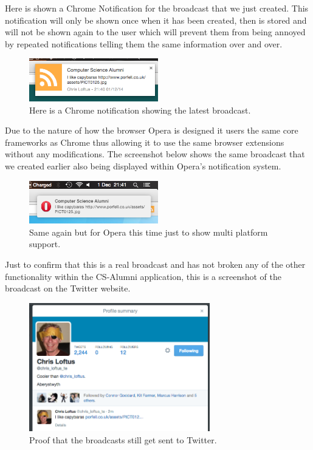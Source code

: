 \documentclass{article}
\begin{document}
Here is shown a Chrome Notification for the broadcast that we just created. This notification will only be shown once when it has been created, then is stored and will not be shown again to the user which will prevent them from being annoyed by repeated notifications telling them the same information over and over.

\begin{figure}[H]
\centering
\includegraphics[width=0.5\textwidth]{chromenotification}
\caption{Here is a Chrome notification showing the latest broadcast.}
\end{figure}

Due to the nature of how the browser Opera is designed it users the same core frameworks as Chrome thus allowing it to use the same browser extensions without any modifications. The screenshot below shows the same broadcast that we created earlier also being displayed within Opera's notification system.

\begin{figure}[H]
\centering
\includegraphics[width=0.5\textwidth]{operanotification}
\caption{Same again but for Opera this time just to show multi platform support.}
\end{figure}

\newpage
Just to confirm that this is a real broadcast and has not broken any of the other functionality within the CS-Alumni application, this is a screenshot of the broadcast on the Twitter website.

\begin{figure}[H]
\centering
\includegraphics[width=0.7\textwidth]{twitterbc}
\caption{Proof that the broadcasts still get sent to Twitter.}
\end{figure}
\end{document}
